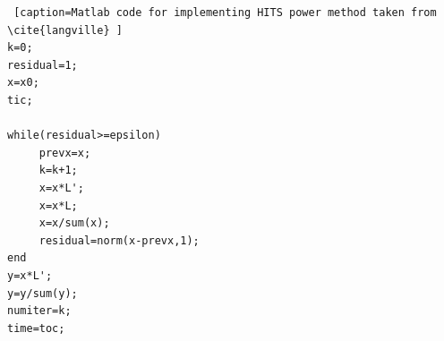 \documentclass[11pt]{report}
\begin{document}
\begin{appendices}
\begin{lstlisting} [caption=Matlab code for implementing HITS power method taken from \cite{langville} ]
k=0;
residual=1;
x=x0;
tic;

while(residual>=epsilon)
     prevx=x;
     k=k+1;
     x=x*L';
     x=x*L;
     x=x/sum(x);
     residual=norm(x-prevx,1);
end
y=x*L';
y=y/sum(y);
numiter=k;
time=toc;

\end{lstlisting} 
\end{appendices}
\end{document}
